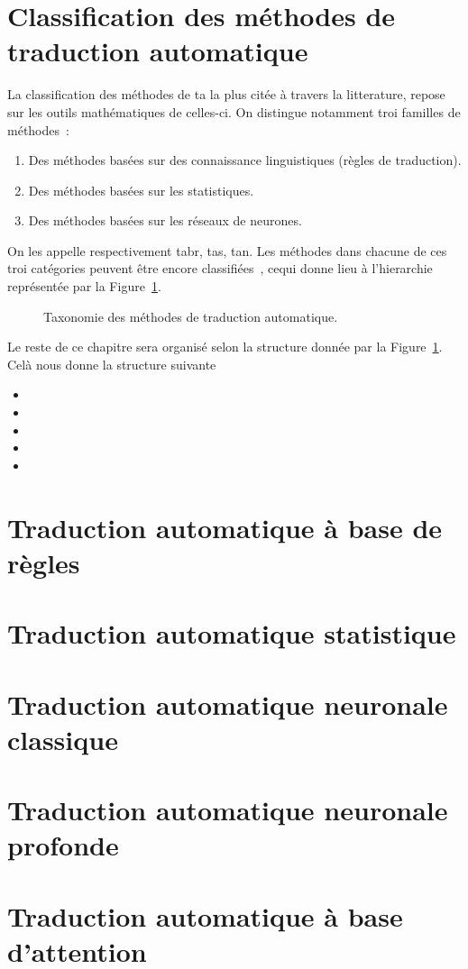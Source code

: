 \section{Classification des méthodes de traduction automatique}

La classification des méthodes de \acrshort{ta} la plus citée à travers la litterature, 
repose sur les outils mathématiques de celles-ci.
On distingue notamment troi familles de méthodes~\cite{deep-nmt-survey}:
\begin{enumerate}
    \item Des méthodes basées sur des connaissance linguistiques (règles de traduction).
    \item Des méthodes basées sur les statistiques.
    \item Des méthodes basées sur les réseaux de neurones.
\end{enumerate}

On les appelle respectivement \Acrfull{tabr}, \Acrfull{tas}, \Acrfull{tan}.
Les méthodes dans chacune de ces troi catégories peuvent être encore classifiées~\cite{deep-nmt-survey,hybrid-mt},
cequi donne lieu à l'hierarchie représentée par la Figure~\ref{fig:mt-taxonomy-tree}.

\begin{figure}
    \begin{center}
       \resizebox{\textwidth}{!}{
         
       }
    \end{center}
    \caption{Taxonomie des méthodes de traduction automatique.}
    \label{fig:mt-taxonomy-tree}
\end{figure}

Le reste de ce chapitre sera organisé selon la structure donnée par la Figure~\ref{fig:mt-taxonomy-tree}. 
Celà nous donne la structure suivante

\begin{itemize}
    \item {}
    \item {}
    \item {}
    \item {}
    \item {}
\end{itemize}

\section{Traduction automatique à base de règles}
\label{sec:rbmt}
\section{Traduction automatique statistique}
\label{sec:smt}
\section{Traduction automatique neuronale classique}
\label{sec:nmt-classic}
\section{Traduction automatique neuronale profonde}
\label{sec:dnmt}
\section{Traduction automatique à base d'attention}
\label{sec:nmt-attention}
